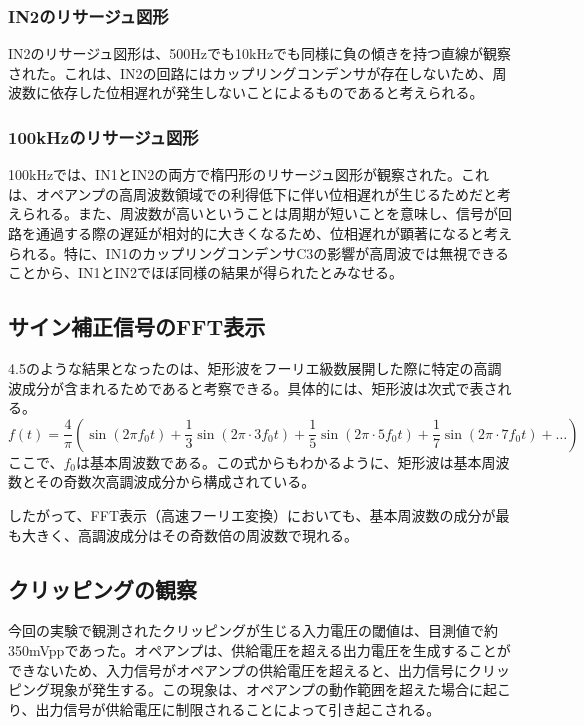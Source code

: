 \documentclass{jlreq}
\numberwithin{equation}{section}
\begin{document}
\subsubsection{IN2のリサージュ図形}
IN2のリサージュ図形は、500Hzでも10kHzでも同様に負の傾きを持つ直線が観察された。これは、IN2の回路にはカップリングコンデンサが存在しないため、周波数に依存した位相遅れが発生しないことによるものであると考えられる。


\subsubsection{100kHzのリサージュ図形}
100kHzでは、IN1とIN2の両方で楕円形のリサージュ図形が観察された。これは、オペアンプの高周波数領域での利得低下に伴い位相遅れが生じるためだと考えられる。また、周波数が高いということは周期が短いことを意味し、信号が回路を通過する際の遅延が相対的に大きくなるため、位相遅れが顕著になると考えられる。特に、IN1のカップリングコンデンサC3の影響が高周波では無視できることから、IN1とIN2でほぼ同様の結果が得られたとみなせる。

\subsection{サイン補正信号のFFT表示}
4.5のような結果となったのは、矩形波をフーリエ級数展開した際に特定の高調波成分が含まれるためであると考察できる。具体的には、矩形波は次式で表される。
\begin{equation}
  f(t) = \frac{4}{\pi} \left( \sin(2\pi f_0 t) + \frac{1}{3} \sin(2\pi \cdot 3 f_0 t) + \frac{1}{5} \sin(2\pi \cdot 5 f_0 t) + \frac{1}{7} \sin(2\pi \cdot 7 f_0 t) + \dots \right)
\end{equation}
ここで、\(f_0\)は基本周波数である。この式からもわかるように、矩形波は基本周波数とその奇数次高調波成分から構成されている。

したがって、FFT表示（高速フーリエ変換）においても、基本周波数の成分が最も大きく、高調波成分はその奇数倍の周波数で現れる。

\subsection{クリッピングの観察}
今回の実験で観測されたクリッピングが生じる入力電圧の閾値は、目測値で約350mVppであった。オペアンプは、供給電圧を超える出力電圧を生成することができないため、入力信号がオペアンプの供給電圧を超えると、出力信号にクリッピング現象が発生する。この現象は、オペアンプの動作範囲を超えた場合に起こり、出力信号が供給電圧に制限されることによって引き起こされる。
\end{document}
